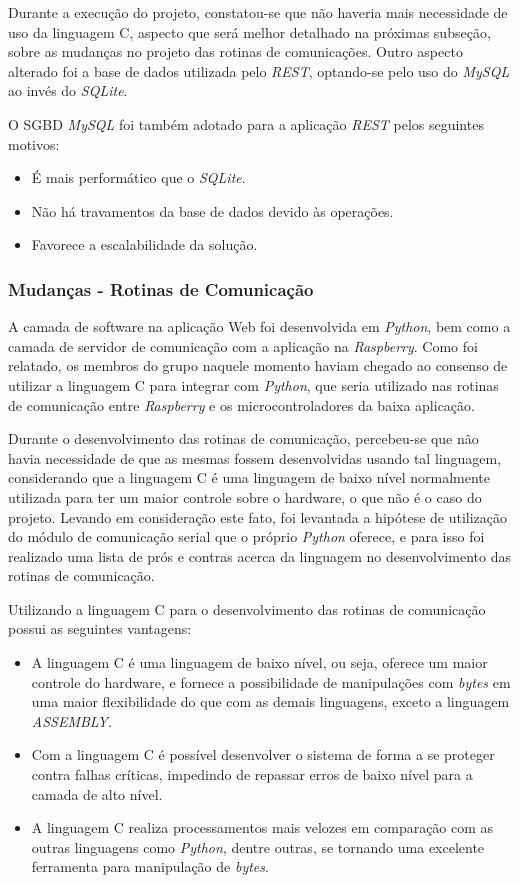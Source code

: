 Durante a execução do projeto, constatou-se que não haveria mais necessidade de uso da linguagem C, aspecto que será melhor detalhado na próximas subseção, sobre as mudanças no projeto das rotinas de comunicações. Outro aspecto alterado foi a base de dados utilizada pelo \textit{REST}, optando-se pelo uso do \textit{MySQL} ao invés do \textit{SQLite}.

O SGBD \textit{MySQL} foi também adotado para a aplicação \textit{REST} pelos seguintes motivos:

\begin{itemize}
    \item É mais performático que o \textit{SQLite}.
    \item Não há travamentos da base de dados devido às operações.
    \item Favorece a escalabilidade da solução.
\end{itemize}

\subsubsection*{\textbf{Mudanças - Rotinas de Comunicação}}

A camada de software na aplicação Web foi desenvolvida em \textit{Python}, bem como a camada de servidor de comunicação com a aplicação na 
\textit{Raspberry}. Como foi relatado, os membros do grupo naquele momento haviam chegado ao consenso de utilizar a linguagem C para integrar 
com \textit{Python}, que seria utilizado nas rotinas de comunicação entre \textit{Raspberry} e os microcontroladores da baixa aplicação.

Durante o desenvolvimento das rotinas de comunicação, percebeu-se que não havia necessidade de que as mesmas fossem desenvolvidas 
usando tal linguagem, considerando que a linguagem C é uma linguagem de baixo nível normalmente utilizada para ter um maior controle sobre o 
hardware, o que não é o caso do projeto. Levando em consideração este fato, foi levantada a hipótese de utilização do módulo de comunicação serial que o próprio 
\textit{Python} oferece, e para isso foi realizado uma lista de prós e contras acerca da linguagem no desenvolvimento das rotinas de comunicação.

Utilizando a linguagem C para o desenvolvimento das rotinas de comunicação possui as seguintes vantagens:

\begin{itemize}
    \item A linguagem C é uma linguagem de baixo nível, ou seja, oferece um maior controle do hardware, e fornece a possibilidade de manipulações com \textit{bytes} em uma maior flexibilidade do que com as demais linguagens, exceto a linguagem \textit{ASSEMBLY}.
    \item Com a linguagem C é possível desenvolver o sistema de forma a se proteger contra falhas críticas, impedindo de repassar erros de baixo nível para a camada de alto nível.
    \item A linguagem C realiza processamentos mais velozes em comparação com as outras linguagens como \textit{Python}, dentre outras, se tornando uma excelente ferramenta para manipulação de \textit{bytes}.
\end{itemize}

